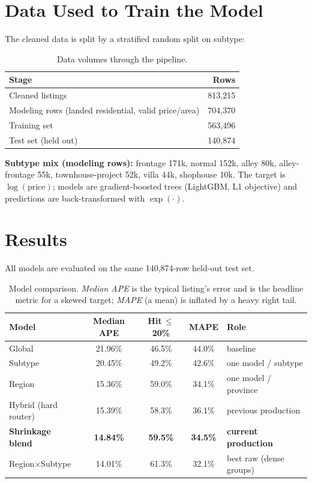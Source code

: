 \documentclass[11pt]{article}
\newcommand{\pct}{\%}
\begin{document}
\section{Data Used to Train the Model}
The cleaned data is split by a stratified random split on subtype:

\begin{table}[h]
\centering
\begin{tabular}{lr}
\toprule
\textbf{Stage} & \textbf{Rows} \\
\midrule
Cleaned listings & 813,215 \\
Modeling rows (landed residential, valid price/area) & 704,370 \\
Training set & 563,496 \\
Test set (held out) & 140,874 \\
\bottomrule
\end{tabular}
\caption{Data volumes through the pipeline.}
\end{table}

\noindent\textbf{Subtype mix (modeling rows):} frontage 171k, normal 152k, alley 80k,
alley-frontage 55k, townhouse-project 52k, villa 44k, shophouse 10k. The target is
$\log(\text{price})$; models are gradient-boosted trees (LightGBM, L1 objective) and predictions are
back-transformed with $\exp(\cdot)$.

\section{Results}
All models are evaluated on the same 140,874-row held-out test set.

\begin{table}[h]
\centering
\begin{tabular}{lccc l}
\toprule
\textbf{Model} & \textbf{Median APE} & \textbf{Hit\,$\leq$20\pct} & \textbf{MAPE} & \textbf{Role} \\
\midrule
Global               & 21.96\pct & 46.5\pct & 44.0\pct & baseline \\
Subtype              & 20.45\pct & 49.2\pct & 42.6\pct & one model / subtype \\
Region               & 15.36\pct & 59.0\pct & 34.1\pct & one model / province \\
Hybrid (hard router) & 15.39\pct & 58.3\pct & 36.1\pct & previous production \\
\textbf{Shrinkage blend} & \textbf{14.84\pct} & \textbf{59.5\pct} & \textbf{34.5\pct} & \textbf{current production} \\
Region$\times$Subtype & 14.01\pct & 61.3\pct & 32.1\pct & best raw (dense groups) \\
\bottomrule
\end{tabular}
\caption{Model comparison. \emph{Median APE} is the typical listing's error and is the headline
metric for a skewed target; \emph{MAPE} (a mean) is inflated by a heavy right tail.}
\end{table}
\end{document}
